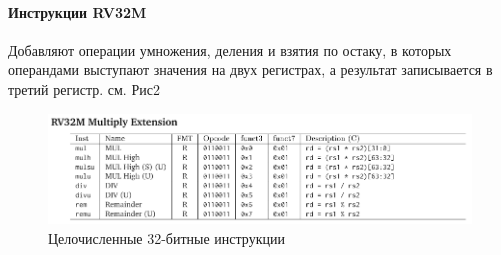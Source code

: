 \documentclass{article}
\begin{document}
\paragraph{Инструкции RV32M}
Добавляют операции умножения, деления и взятия по остаку, в которых операндами выступают значения на двух регистрах, а результат записывается в третий регистр. см. Рис2
\begin{figure}[H]
	\includegraphics[width=1\textwidth]{pictures/r32m}
	\caption{Целочисленные 32-битные инструкции}
\end{figure}
\end{document}
